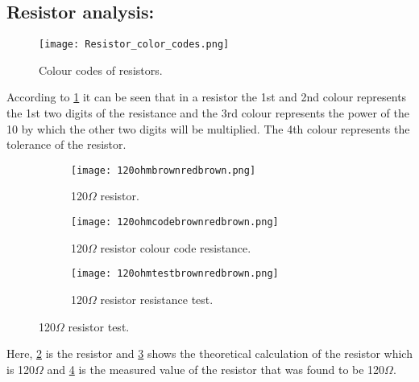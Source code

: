 \documentclass[a4paper, 14pt]{extarticle}
\begin{document}
    \newpage

        \subsection{Resistor analysis:}
            \begin{figure}[h]
            \centering
                \texttt{[image: Resistor\_color\_codes.png]}
                \caption{Colour codes of resistors.}
                \label{fig:mainfig3}
            \end{figure}
            According to \ref{fig:mainfig3} it can be seen that in a resistor the 1st and 2nd colour represents the 1st two digits of the resistance and the 3rd colour represents the power of the 10 by which the other two digits will be multiplied. The 4th colour represents the tolerance of the resistor.
            
            \newpage
            
            \begin{figure}[htbp]
            \centering
                \begin{subfigure}[H]{0.3\textwidth}
                \centering
                    \texttt{[image: 120ohmbrownredbrown.png]}
                    \caption{120$\Omega$ resistor.}
                    \label{fig:subfig9}
                \end{subfigure}
                \hfill
                \begin{subfigure}[H]{0.3\textwidth}
                \centering
                    \texttt{[image: 120ohmcodebrownredbrown.png]}
                    \caption{120$\Omega$ resistor colour code resistance.}
                    \label{fig:subfig10}
                \end{subfigure}
                \hfill
                \begin{subfigure}[H]{0.3\textwidth}
                \centering
                    \texttt{[image: 120ohmtestbrownredbrown.png]}
                    \caption{120$\Omega$ resistor resistance test.}
                    \label{fig:subfig11}
                \end{subfigure}
                \caption{120$\Omega$ resistor test.}
                \label{fig:mainfig4}
            \end{figure}
            Here, \ref{fig:subfig9} is the resistor and \ref{fig:subfig10} shows the theoretical calculation of the resistor which is 120$\Omega$ and \ref{fig:subfig11} is the measured value of the resistor that was found to be 120$\Omega$.
\end{document}
